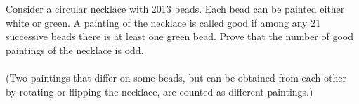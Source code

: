 \documentclass{article}
\begin{document}
\setlength{\parindent}{0pt}
Consider a circular necklace with 2013 beads. Each bead can be painted either white or green. A painting of the necklace is called good if among any 21 successive beads there is at least one green bead. Prove that the number of good paintings of the necklace is odd.\\
\ \\
(Two paintings that differ on some beads, but can be obtained from each other by rotating or flipping the necklace, are counted as different paintings.)

\end{document}
